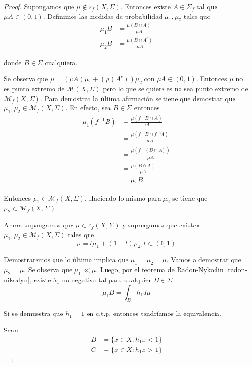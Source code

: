 \begin{proof}
	Supongamos que $\mu \notin \varepsilon_f(X,\Sigma)$. Entonces existe $A \in \Sigma_f$ tal que $\mu A \in (0,1)$. Definimos las medidas de probabilidad $\mu_1,\mu_2$ tales que
	\begin{align}
		\mu_1 B &= \frac{\mu(B \cap A)}{\mu A}\\
		\mu_2 B &= \frac{\mu(B \cap A^c)}{\mu A}
	\end{align}
	
	donde $B \in \Sigma$ cualquiera.
	
	Se observa que $\mu = (\mu A) \mu_1 + (\mu(A^c)) \mu_2$ con $\mu A \in (0,1)$. Entonces $\mu$ no es punto extremo de $\mathcal{M}(X,\Sigma)$ pero lo que se quiere es no sea punto extremo de $\mathcal{M}_f(X,\Sigma)$. Para demostrar la última afirmación se tiene que demostrar que $\mu_1,\mu_2 \in \mathcal{M}_f(X,\Sigma)$. En efecto, sea $B \in \Sigma$ entonces
	\begin{align}
		\mu_1(f^{-1}B) &= \frac{\mu(f^{-1}B \cap A)}{\mu A}\\
		&= \frac{\mu(f^{-1}B \cap f^{-1}A)}{\mu A}\\
		&= \frac{\mu(f^{-1}(B \cap A))}{\mu A}\\
		&= \frac{\mu (B \cap A)}{\mu A}\\		
		&= \mu_1 B
	\end{align}
	
	Entonces $\mu_1 \in \mathcal{M}_f(X,\Sigma)$. Haciendo lo mismo para $\mu_2$ se tiene que $\mu_2 \in \mathcal{M}_f(X,\Sigma)$.
	
	Ahora supongamos que $\mu \in \varepsilon_f(X,\Sigma)$ y supongamos que existen $\mu_1,\mu_2 \in \mathcal{M}_f(X,\Sigma)$ tales que
	\begin{equation}
		\mu = t\mu_1 + (1-t)\mu_2, t \in (0,1)
	\end{equation}
	
	Demostraremos que lo último implica que $\mu_1=\mu_2=\mu$. Vamos a demostrar que $\mu_2=\mu$. Se observa que $\mu_1 \ll \mu$. Luego, por el teorema de Radon-Nykodin \ref{radon-nikodyn}, existe $h_1$ no negativa tal para cualquier $B \in \Sigma$
	\begin{equation}
		\mu_1 B = \int_B h_1 d\mu
	\end{equation}
	
	Si se demuestra que $h_1 = 1$ en c.t.p. entonces tendríamos la equivalencia.
	
	Sean
	\begin{align}
		B &= \{ x \in X: h_1 x < 1 \}\\
		C &= \{ x \in X: h_1 x > 1 \}
	\end{align}
	

\end{proof}
